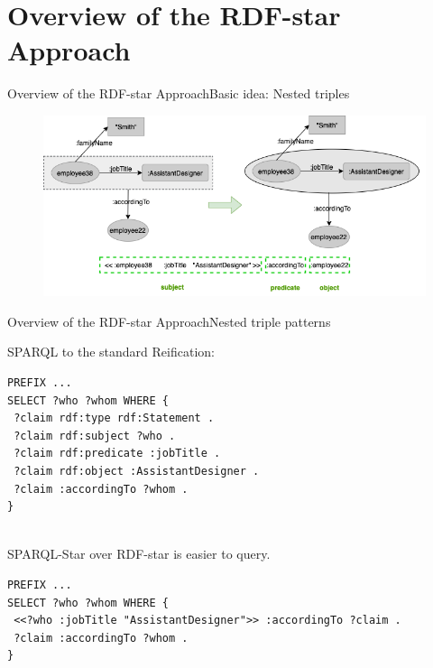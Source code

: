 \documentclass[aspectratio=169]{beamer}
\begin{document}
\section{Overview of the RDF-star Approach}
\begin{frame}{Overview of the RDF-star Approach}{Basic idea: Nested triples}
    \begin{figure}
        \centering
        \includegraphics[scale=0.5]{images/Example-2-To-Nested.png}
    \end{figure}
\end{frame}

\begin{frame}[fragile]{Overview of the RDF-star Approach}{Nested triple patterns}
\vspace{2mm}
\begin{minipage}{0.8\textwidth}
SPARQL to the standard Reification:
\begin{lstlisting}[language=SPARQL,basicstyle=\ttfamily\footnotesize]
PREFIX ...
SELECT ?who ?whom WHERE {
 ?claim rdf:type rdf:Statement .
 ?claim rdf:subject ?who .
 ?claim rdf:predicate :jobTitle .
 ?claim rdf:object :AssistantDesigner .
 ?claim :accordingTo ?whom .
}
\end{lstlisting}
\end{minipage}
\begin{minipage}{0.8\textwidth}
\centering
\end{minipage}
\\SPARQL-Star over RDF-star is easier to query.
\begin{minipage}{0.8\textwidth}
\begin{lstlisting}[language=SPARQL,basicstyle=\ttfamily\footnotesize]
PREFIX ...
SELECT ?who ?whom WHERE {
 <<?who :jobTitle "AssistantDesigner">> :accordingTo ?claim .
 ?claim :accordingTo ?whom .
}
\end{lstlisting}
\end{minipage}
\end{frame}
\end{document}
